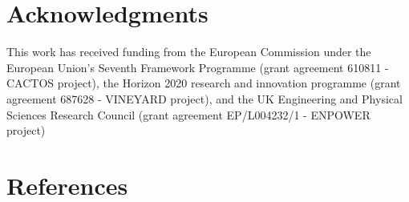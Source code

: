 \documentclass[preprint]{elsarticle}
\begin{document}
\section*{Acknowledgments}
\noindent This work has received funding from the European Commission under the European Union's Seventh Framework Programme (grant agreement 610811 - CACTOS project), the Horizon 2020 research and innovation programme (grant agreement 687628 - VINEYARD project), and the UK Engineering and Physical Sciences Research Council  (grant agreement EP/L004232/1 - ENPOWER project)


  
% 

\section*{References}


\end{document}
